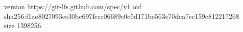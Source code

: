 version https://git-lfs.github.com/spec/v1
oid sha256:f1ae8027093ce30bc697fccc06689c0c5d171be563e70dca7cc159c812217268
size 1398256
